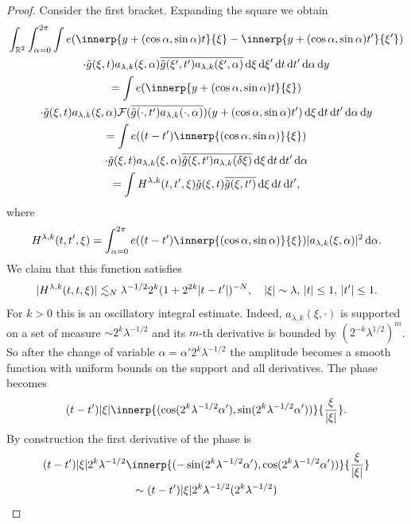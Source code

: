 \begin{proof}
Consider the first bracket.
Expanding the square we obtain
\begin{multline*}
\int_{\R^{2}} \int_{\alpha=0}^{2\pi} \int e(\innerp{y+(\cos\alpha,\sin\alpha)t}{\xi}-\innerp{y+(\cos\alpha,\sin\alpha)t'}{\xi'}) \\
\cdot \tilde{g}(\xi,t) a_{\lambda,k}(\xi,\alpha) \overline{\tilde{g}(\xi',t') a_{\lambda,k}(\xi',\alpha)} \dif \xi \dif \xi' \dif t \dif t' \dif \alpha \dif y\\
=
\int e(\innerp{y+(\cos\alpha,\sin\alpha)t}{\xi}) \\
\cdot \tilde{g}(\xi,t) a_{\lambda,k}(\xi,\alpha) \FT(\overline{\tilde{g}(\cdot,t') a_{\lambda,k}(\cdot,\alpha)})(y+(\cos\alpha,\sin\alpha)t') \dif \xi \dif t \dif t' \dif \alpha \dif y\\
=
\int e((t-t')\innerp{(\cos\alpha,\sin\alpha)}{\xi}) \\
\cdot \tilde{g}(\xi,t) a_{\lambda,k}(\xi,\alpha) \overline{\tilde{g}(\xi,t') a_{\lambda,k}(\delta \xi)} \dif \xi \dif t \dif t' \dif \alpha\\
=
\int H^{\lambda,k}(t,t',\xi) \tilde{g}(\xi,t) \overline{\tilde{g}(\xi,t')} \dif \xi \dif t \dif t',
\end{multline*}
where
\[
H^{\lambda,k}(t,t',\xi)
=
\int_{\alpha=0}^{2\pi} e((t-t')\innerp{(\cos\alpha,\sin\alpha)}{\xi}) \abs{a_{\lambda,k}(\xi,\alpha)}^{2} \dif \alpha.
\]
We claim that this function satisfies
\begin{equation}
\label{eq:MSS92-TT*}
\lvert H^{\lambda,k}(t,t,\xi)\rvert
\lesssim_{N}
\lambda^{-1/2}2^{k} (1+2^{2k}\lvert t-t'\rvert)^{-N},
\quad
\lvert\xi\rvert\sim\lambda,\,
\lvert t\rvert\leq 1,\,
\lvert t'\rvert\leq 1.
\end{equation}
For $k>0$ this is an oscillatory integral estimate.
Indeed, $a_{\lambda,k}(\xi,\cdot)$ is supported on a set of measure $\sim 2^{k} \lambda^{-1/2}$ and its $m$-th derivative is bounded by $(2^{-k}\lambda^{1/2})^{m}$.
So after the change of variable $\alpha= \alpha' 2^{k}\lambda^{-1/2}$ the amplitude becomes a smooth function with uniform bounds on the support and all derivatives.
The phase becomes
\[
(t-t') \abs{\xi} \innerp{(\cos(2^{k}\lambda^{-1/2}\alpha'),\sin (2^{k}\lambda^{-1/2}\alpha'))}{\frac{\xi}{\abs{\xi}}}.
\]
By construction the first derivative of the phase is
\begin{multline*}
(t-t') \abs{\xi} 2^{k}\lambda^{-1/2} \innerp{(-\sin(2^{k}\lambda^{-1/2}\alpha'),\cos (2^{k}\lambda^{-1/2}\alpha'))}{\frac{\xi}{\abs{\xi}}}\\
\sim
(t-t') \abs{\xi} 2^{k}\lambda^{-1/2} (2^{k}\lambda^{-1/2})

\end{multline*}
\end{proof}
